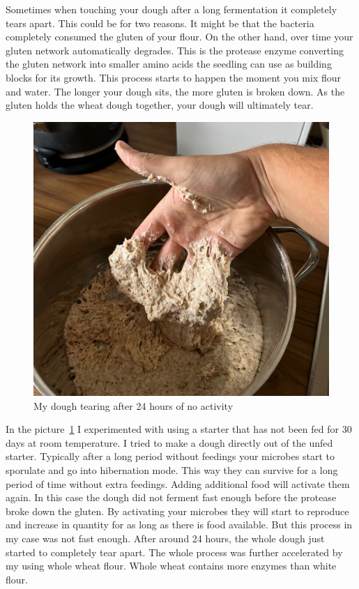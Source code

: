 Sometimes when touching your dough after a long fermentation
it completely tears apart. This could be for two reasons. It might
be that the bacteria completely consumed the gluten of your flour.
On the other hand, over time your gluten network automatically
degrades. This is the protease enzyme converting the gluten
network into smaller amino acids the seedling can use as
building blocks for its growth. This process starts to happen
the moment you mix flour and water. The longer your dough sits,
the more gluten is broken down. As the gluten holds the
wheat dough together, your dough will ultimately tear.

\begin{figure}[!htb]
  \includegraphics[width=1.0\textwidth]{tearing-dough}
  \caption{My dough tearing after 24 hours of no activity}
  \label{fig:tearing-dough}
\end{figure}

In the picture~\ref{fig:tearing-dough} I experimented with
using a starter that has not been fed for 30 days at room temperature.
I tried to make a dough directly out of the unfed starter.
Typically after a long period
without feedings your microbes start to sporulate and go
into hibernation mode. This way they can survive for a long
period of time without extra feedings. Adding additional food
will activate them again. In this case the dough did not ferment
fast enough before the protease broke down the gluten. By activating
your microbes they will start to reproduce and increase in quantity
for as long as there is food available. But this process
in my case was not fast enough. After around 24 hours, the whole
dough just started to completely tear apart. The whole process was further
accelerated by my using whole wheat flour. Whole wheat
contains more enzymes than white flour.

